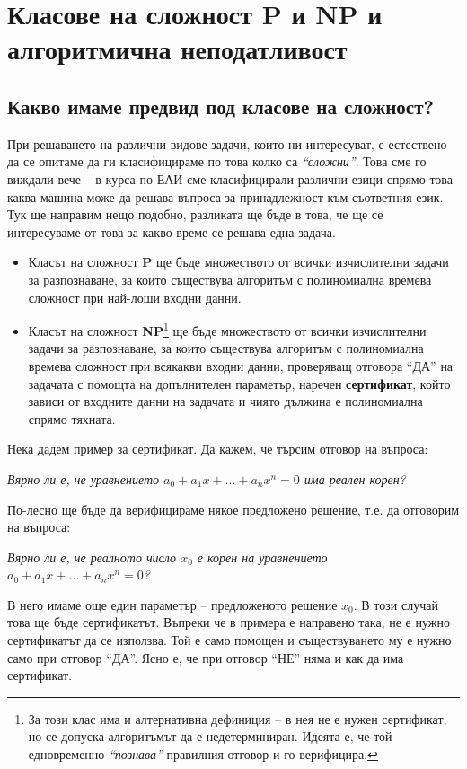 
\chapter{Класове на сложност \textbf{P} и \textbf{NP} и алгоритмична неподатливост}

\section{Какво имаме предвид под класове на сложност?}

При решаването на различни видове задачи, които ни интересуват, е естествено да се опитаме да ги класифицираме по това колко са \textit{``сложни''}.
Това сме го виждали вече -- в курса по ЕАИ сме класифицирали различни езици спрямо това каква машина може да решава въпроса за принадлежност към съответния език.
Тук ще направим нещо подобно, разликата ще бъде в това, че ще се интересуваме от това за какво време се решава една задача.
\begin{itemize}
      \item Класът на сложност \textbf{P} ще бъде множеството от всички изчислителни задачи за разпознаване, за които съществува алгоритъм с полиномиална времева сложност при най-лоши входни данни.
      \item Класът на сложност \textbf{NP}\footnote{
                  За този клас има и алтернативна дефиниция -- в нея не е нужен сертификат, но се допуска алгоритъмът да е недетерминиран.
                  Идеята е, че той едновременно \textit{``познава''} правилния отговор и го верифицира.
            } ще бъде множеството от всички изчислителни задачи за разпознаване, за които съществува алгоритъм с полиномиална времева сложност при всякакви входни данни, проверяващ отговора ``ДА'' на задачата с помощта на допълнителен параметър, наречен \textbf{сертификат}, който зависи от входните данни на задачата и чиято дължина е полиномиална спрямо тяхната.
\end{itemize}
Нека дадем пример за сертификат.
Да кажем, че търсим отговор на въпроса:
\begin{center}
      \textit{Вярно ли е, че уравнението $a_0 + a_1 x + \dots + a_n x^n = 0$ има реален корен?}
\end{center}
По-лесно ще бъде да верифицираме някое предложено решение, т.е. да отговорим на въпроса:
\begin{center}
      \textit{Вярно ли е, че реалното число $x_0$ е корен на уравнението $a_0 + a_1 x + \dots + a_n x^n = 0$?}
\end{center}
В него имаме още един параметър -- предложеното решение $x_0$.
В този случай това ще бъде сертификатът.
Въпреки че в примера е направено така, не е нужно сертификатът да се използва.
Той е само помощен и съществуването му е нужно само при отговор ``ДА''.
Ясно е, че при отговор ``НЕ'' няма и как да има сертификат.

